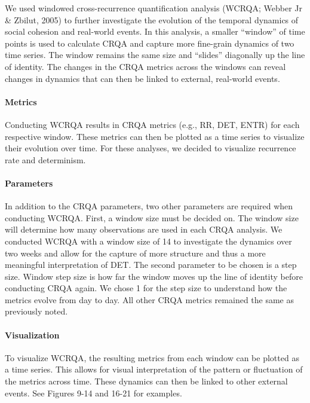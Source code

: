 \documentclass[english,man]{apa6}
\begin{document}
We used windowed cross-recurrence quantification analysis (WCRQA; Webber Jr \& Zbilut, 2005) to further investigate the evolution of the temporal dynamics of social cohesion and real-world events. In this analysis, a smaller \enquote{window} of time points is used to calculate CRQA and capture more fine-grain dynamics of two time series. The window remains the same size and \enquote{slides} diagonally up the line of identity. The changes in the CRQA metrics across the windows can reveal changes in dynamics that can then be linked to external, real-world events.

\hypertarget{metrics-1}{%
\paragraph{Metrics}\label{metrics-1}}

Conducting WCRQA results in CRQA metrics (e.g., RR, DET, ENTR) for each respective window. These metrics can then be plotted as a time series to visualize their evolution over time. For these analyses, we decided to visualize recurrence rate and determinism.

\hypertarget{parameters-1}{%
\paragraph{Parameters}\label{parameters-1}}

In addition to the CRQA parameters, two other parameters are required when conducting WCRQA. First, a window size must be decided on. The window size will determine how many observations are used in each CRQA analysis. We conducted WCRQA with a window size of 14 to investigate the dynamics over two weeks and allow for the capture of more structure and thus a more meaningful interpretation of DET. The second parameter to be chosen is a step size. Window step size is how far the window moves up the line of identity before conducting CRQA again. We chose 1 for the step size to understand how the metrics evolve from day to day. All other CRQA metrics remained the same as previously noted.

\hypertarget{visualization-1}{%
\paragraph{Visualization}\label{visualization-1}}

To visualize WCRQA, the resulting metrics from each window can be plotted as a time series. This allows for visual interpretation of the pattern or fluctuation of the metrics across time. These dynamics can then be linked to other external events. See Figures 9-14 and 16-21 for examples.
\end{document}
